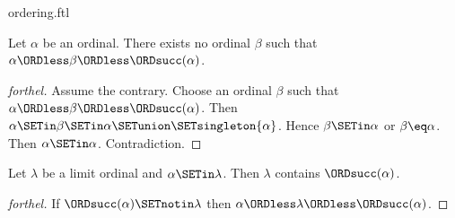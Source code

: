 \documentclass{naproche-library}
\begin{document}
\begin{smodule}[title=The Standard Ordering of the Ordinals]{ordering.ftl}
\begin{proposition}[forthel,id=SET_THEORY_02_4240355610329088]
  Let $\alpha$ be an ordinal.
  There exists no ordinal $\beta$ such that $\alpha \ORDless \beta \ORDless \ORDsucc(\alpha)$.
\end{proposition}
\begin{proof}[forthel]
  Assume the contrary.
  Choose an ordinal $\beta$ such that $\alpha \ORDless \beta \ORDless \ORDsucc(\alpha)$.
  Then $\alpha \SETin \beta \SETin \alpha \SETunion \SETsingleton{\alpha}$.
  Hence $\beta \SETin \alpha$ or $\beta \eq \alpha$.
  Then $\alpha \SETin \alpha$.
  Contradiction.
\end{proof}

\begin{proposition}[forthel,id=SET_THEORY_02_4659024620421120]
  Let $\lambda$ be a limit ordinal and $\alpha \SETin \lambda$.
  Then $\lambda$ contains $\ORDsucc(\alpha)$.
\end{proposition}
\begin{proof}[forthel]
  If $\ORDsucc(\alpha) \SETnotin \lambda$ then $\alpha \ORDless \lambda \ORDless \ORDsucc(\alpha)$.
\end{proof}
\end{smodule}
\end{document}
